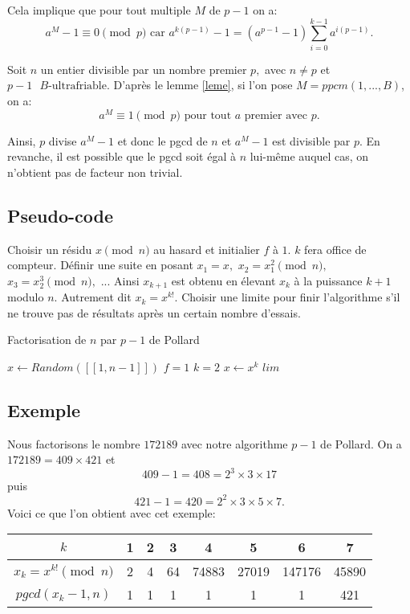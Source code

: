\documentclass[french, 12pt, titlepage]{article}
\begin{document}
Cela implique que pour tout multiple $M$ de $p-1$ on a: \[ a^M - 1 \equiv 0 \pmod p \text{ car } a^{k(p-1)} - 1 = (a^{p-1} - 1 )\sum\limits_{i=0}^{k-1} a^{i(p-1)} . \]

Soit $n$ un entier divisible par un nombre premier $p,$ avec $n \neq p$
et $p-1 \text{ } B\text{-ultrafriable}.$
D'après le lemme \ref{leme}, si l'on pose $M = ppcm(1, ..., B)$, on a: \[ a^M \equiv 1 \pmod p \text{ pour tout } a \text{ premier avec } p . \]

Ainsi, $p$ divise $a^M - 1$ et donc le pgcd de $n$ et $a^M - 1$ est
divisible par $p.$
En revanche, il est possible que le pgcd soit égal à $n$ lui-même auquel cas, on n'obtient pas de facteur non trivial.

\subsection{Pseudo-code}

Choisir un résidu $x \pmod n$ au hasard et initialier $f$ à $1.$ $k$ fera office de compteur.
Définir une suite en posant $x_1 = x,$ $x_2 = x_1^2 \pmod n,$ $x_3 = x_2^3 \pmod n,$ ... Ainsi $x_ {k+1}$ est obtenu en élevant $x_k$ à la puissance $k+1$ modulo $n.$ Autrement dit $x_k = x^{k!}.$
Choisir une limite pour finir l'algorithme s'il ne trouve pas de résultats après un certain nombre d'essais.

\begin{algorithm}
\caption{Factorisation de $n$ par $p-1$ de Pollard}
\BlankLine
$x \gets Random([\![1,n-1]\!])$\;
$f = 1$\;
$k = 2$\;
$x \gets x^k$\;
$lim$\;
\end{algorithm}

\subsection{Exemple}

Nous factorisons le nombre $172189$ avec notre algorithme $p-1$ de Pollard.
On a $172189 = 409 \times 421$ et \[409 - 1 = 408 = 2^3 \times 3 \times 17 \] puis \[421-1 = 420 = 2^2 \times 3 \times 5 \times 7.\] 
Voici ce que l'on obtient avec cet exemple:

\begin{center}
\begin{tabular}{|c||c|c|c|c|c|c|c|}
\hline
$k$ & 1 & 2 & 3 & 4 & 5 & 6 & 7 \\
\hline
$x_k = x^{k!} \pmod n$ & 2 & 4 & 64 & 74883 & 27019 & 147176 & 45890 \\
\hline
$pgcd(x_k -1, n)$ & 1 & 1 & 1 & 1 & 1 & 1 & 421\\
\hline
\end{tabular}
\end{center}
\end{document}
